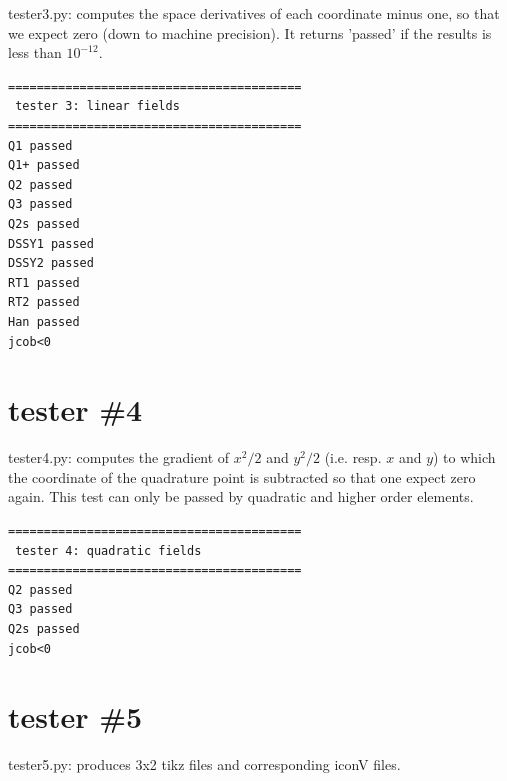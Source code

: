 {\pythonfile tester3.py}: computes the space derivatives of each coordinate minus one, 
so that we expect zero (down to machine precision). It returns 'passed' if the results is 
less than $10^{-12}$.   



\begin{tiny}
\begin{verbatim}
=========================================
 tester 3: linear fields
=========================================
Q1 passed
Q1+ passed
Q2 passed
Q3 passed
Q2s passed
DSSY1 passed
DSSY2 passed
RT1 passed
RT2 passed
Han passed
jcob<0
\end{verbatim}
\end{tiny}



\newpage
\section*{tester \#4}


{\pythonfile tester4.py}: computes the gradient of $x^2/2$ and $y^2/2$ (i.e. resp. $x$ and $y$) to which the coordinate of the quadrature point is subtracted so that one expect zero again. This test can only be passed by quadratic and higher order elements.



\begin{tiny}
\begin{verbatim}
=========================================
 tester 4: quadratic fields
=========================================
Q2 passed
Q3 passed
Q2s passed
jcob<0
\end{verbatim}
\end{tiny}



\newpage
\section*{tester \#5}

{\pythonfile tester5.py}: produces 3x2 tikz files and corresponding iconV files. 

